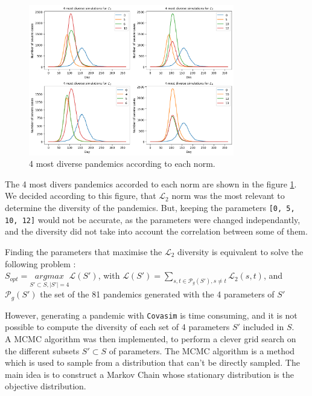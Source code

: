 \begin{figure}
    \centering
    \includegraphics[width=0.8\textwidth]{figures/most_different_pandemics.png}
    \caption{4 most diverse pandemics according to each norm.}
    \label{fig:diversity_pandemics}
\end{figure}


The 4 most divers pandemics accorded to each norm are shown in the figure \ref{fig:diversity_pandemics}.
We decided according to this figure, that $\mathcal{L}_2$ norm was the most relevant to determine the diversity of the pandemics.
But, keeping the parameters \texttt{[0, 5, 10, 12]} would not be accurate, as the parameters were changed independantly, and the diversity did not take into account the correlation between some of them. 

Finding the parameters that maximise the $\mathcal{L}_2$ diversity is equivalent to solve the following problem : \\

$ S_{opt} = \underset{S' \subset S , \vert S' \vert =4 }{argmax} \mathcal{L}(S')$, with $ \mathcal{L}(S')= \sum_{s, t \in \mathcal{P}_g(S') , s \neq t }{\mathcal{L}_2(s,t)}$, and  $\mathcal{P}_{g}(S')$ the set of the 81 pandemics generated with the 4 parameters of $S'$

However, generating a pandemic with \texttt{Covasim} is time consuming, and it is not possible to compute the diversity of each set of 4 parameters $S'$ included in $S$.\\[1cm]


A MCMC algorithm \cite*{diaconis2009markov} was then implemented, to perform a clever grid search on the different subsets $S' \subset S $ of parameters.
The MCMC algorithm is a method which is used to sample from a distribution that can't be directly sampled. 
The main idea is to construct a Markov Chain whose stationary distribution is the objective distribution.

